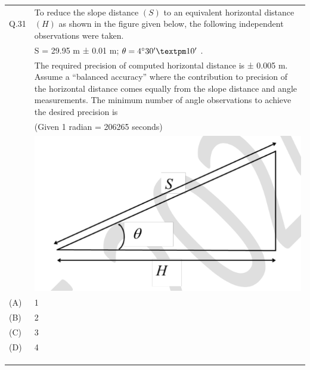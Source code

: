 \documentclass[12pt]{article}
\begin{document}
\begin{table}[H]
\renewcommand{\arraystretch}{2.5}
\setlength{\tabcolsep}{8pt}
\begin{tabular}{|l|p{15cm}|}
\hline

& \\ \hline
 Q.31 &To reduce the slope distance $(S)$ to an equivalent horizontal distance $(H)$ as shown in the figure given below, the following independent observations were taken.\\
 &S = 29.95 m ± 0.01 m; $\theta = 4\degree 30' ± 10'$ . \\
 &The required precision of computed horizontal distance is ± 0.005 m. Assume a “balanced accuracy” where the contribution to precision of the horizontal distance comes equally from the slope distance and angle measurements. The minimum number of angle observations to achieve the desired precision is\\ 
 & (Given 1 radian = 206265 seconds) \\
\hline
& \includegraphics[]{LatexImage6.png}\\ \hline
(A)&1\\ \hline
(B)&2\\ \hline
(C)&3\\ \hline
(D)&4 \\ \hline
 & \\
 & \\
 & \\ \hline


\end{tabular}
\end{table}
\end{document}
